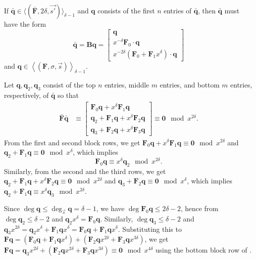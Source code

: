 \begin{lem}
\label{lem:A_delta-1Form}If $\bar{\mathbf{q}}\in\langle(\bar{\mathbf{F}},2\delta,\vec{s'})\rangle_{\delta-1}$
and $\mathbf{q}$ consists of the first $n$ entries of $\bar{\mathbf{q}}$,
then $\bar{\mathbf{q}}$ must have the form \[
\bar{\mathbf{q}}=\mathbf{B}\mathbf{q}=\left[\begin{array}{r}
\mathbf{q}\\
x^{-\delta}\mathbf{F}_{0}\cdot\mathbf{q}\\
x^{-2\delta}\left(\mathbf{F}_{0}+\mathbf{F}_{1}x^{\delta}\right)\cdot\mathbf{q}\end{array}\right]\]
 and $\mathbf{q}\in\left\langle \left(\mathbf{F},\sigma,\vec{s}\right)\right\rangle _{\delta-1}$.\end{lem}
\begin{pf}
Let $\mathbf{q},\mathbf{q}_{2},\mathbf{q}_{3}$ consist of the top
$n$ entries, middle $m$ entries, and bottom $m$ entries, respectively,
of $\mathbf{\bar{\mathbf{q}}}$ so that \begin{align}
\bar{\mathbf{F}}\bar{\mathbf{q}} & \equiv\left[\begin{array}{r}
\mathbf{F}_{0}\mathbf{q}+x^{\delta}\mathbf{F}_{1}\mathbf{q}\\
\mathbf{q}_{2}+\mathbf{F}_{1}\mathbf{q}+x^{\delta}\mathbf{F}_{2}\mathbf{q}\\
\mathbf{q}_{3}+\mathbf{F}_{2}\mathbf{q}+x^{\delta}\mathbf{F}_{3}\mathbf{q}\end{array}\right]\equiv\mathbf{0}\mod x^{2\delta}.\label{eq:Aq}\end{align}
 From the first and second block rows, we get $\mathbf{F}_{0}\mathbf{q}+x^{\delta}\mathbf{F}_{1}\mathbf{q}\equiv\mathbf{0}\mod x^{2\delta}$
and $\mathbf{q}_{2}+\mathbf{F}_{1}\mathbf{q}\equiv\mathbf{0}\mod x^{\delta}$,
which implies \begin{equation}
\mathbf{F}_{0}\mathbf{q}\equiv x^{\delta}\mathbf{q}_{2}\mod x^{2\delta}.\label{eq:q1q2}\end{equation}
 Similarly, from the second and the third rows, we get $\mathbf{q}_{2}+\mathbf{F}_{1}\mathbf{q}+x^{\delta}\mathbf{F}_{2}\mathbf{q}\equiv\mathbf{0}\mod x^{2\delta}$
and $\mathbf{q}_{3}+\mathbf{F}_{2}\mathbf{q}\equiv\mathbf{0}\mod x^{\delta}$,
which implies $\mathbf{q}_{2}+\mathbf{F}_{1}\mathbf{q}\equiv x^{\delta}\mathbf{q}_{3}\mod x^{2\delta}$.

Since $\deg\mathbf{q}\le\deg_{\vec{s}}\mathbf{q}=\delta-1$, we have
$\deg\mathbf{F}_{0}\mathbf{q}\le2\delta-2$, hence from 
$\deg\mathbf{q}_{2}\le\delta-2$ and $\mathbf{q}_{2}x^{\delta}=\mathbf{F}_{0}\mathbf{q}$.
Similarly, $\deg\mathbf{q}_{3}\le\delta-2$ and $\mathbf{q}_{3}x^{2\delta}=\mathbf{q}_{2}x^{\delta}+\mathbf{F}_{1}\mathbf{q}x^{\delta}=\mathbf{F}_{0}\mathbf{q}+\mathbf{F}_{1}\mathbf{q}x^{\delta}$.
Substituting this to $\mathbf{F}\mathbf{q}=(\mathbf{F}_{0}\mathbf{q}+\mathbf{F}_{1}\mathbf{q}x^{\delta})+(\mathbf{F}_{2}\mathbf{q}x^{2\delta}+\mathbf{F}_{3}\mathbf{q}x^{3\delta})$,
we get $\mathbf{F}\mathbf{q}=\mathbf{q}_{3}x^{2\delta}+(\mathbf{F}_{2}\mathbf{q}x^{2\delta}+\mathbf{F}_{3}\mathbf{q}x^{3\delta})\equiv\mathbf{0}\mod x^{4\delta}$
using the bottom block row of .\end{pf}
